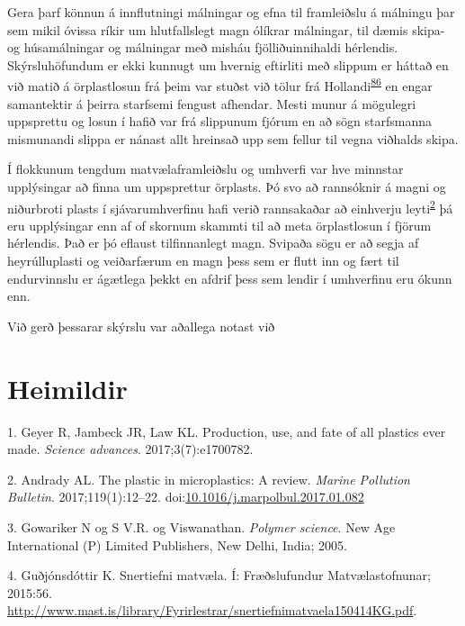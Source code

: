 \documentclass[icelandic,]{book}
\begin{document}
Gera þarf könnun á innflutningi málningar og efna til framleiðslu á málningu þar sem mikil óvissa ríkir um hlutfallslegt magn ólíkrar málningar, til dæmis skipa- og húsamálningar og málningar með misháu fjölliðuinnihaldi hérlendis. Skýrsluhöfundum er ekki kunnugt um hvernig eftirliti með slippum er háttað en við matið á örplastlosun frá þeim var stuðst við tölur frá Hollandi\textsuperscript{\protect\hyperlink{ref-Verschoor2016}{86}} en engar samantektir á þeirra starfsemi fengust afhendar. Mesti munur á mögulegri uppsprettu og losun í hafið var frá slippunum fjórum en að sögn starfsmanna mismunandi slippa er nánast allt hreinsað upp sem fellur til vegna viðhalds skipa.

Í flokkunum tengdum matvælaframleiðslu og umhverfi var hve minnstar upplýsingar að finna um uppsprettur örplasts. Þó svo að rannsóknir á magni og niðurbroti plasts í sjávarumhverfinu hafi verið rannsakaðar að einhverju leyti\textsuperscript{\protect\hyperlink{ref-Andrady2017}{2}} þá eru upplýsingar enn af of skornum skammti til að meta örplastlosun í fjörum hérlendis. Það er þó eflaust tilfinnanlegt magn. Svipaða sögu er að segja af heyrúlluplasti og veiðarfærum en magn þess sem er flutt inn og fært til endurvinnslu er ágætlega þekkt en afdrif þess sem lendir í umhverfinu eru ókunn enn.

Við gerð þessarar skýrslu var aðallega notast við

\hypertarget{heimildir}{%
\chapter*{Heimildir}\label{heimildir}}

\hypertarget{refs}{}
\leavevmode\hypertarget{ref-geyer2017production}{}%
1. Geyer R, Jambeck JR, Law KL. Production, use, and fate of all plastics ever made. \emph{Science advances}. 2017;3(7):e1700782.

\leavevmode\hypertarget{ref-Andrady2017}{}%
2. Andrady AL. The plastic in microplastics: A review. \emph{Marine Pollution Bulletin}. 2017;119(1):12--22. doi:\href{https://doi.org/10.1016/j.marpolbul.2017.01.082}{10.1016/j.marpolbul.2017.01.082}

\leavevmode\hypertarget{ref-Gowariker2005}{}%
3. Gowariker N og S V.R. og Viswanathan. \emph{Polymer science}. New Age International (P) Limited Publishers, New Delhi, India; 2005.

\leavevmode\hypertarget{ref-Gudjonsdottir2015}{}%
4. Guðjónsdóttir K. Snertiefni matvæla. Í: Fræðslufundur Matvælastofnunar; 2015:56. \url{http://www.mast.is/library/Fyrirlestrar/snertiefnimatvaela150414KG.pdf}.
\end{document}
